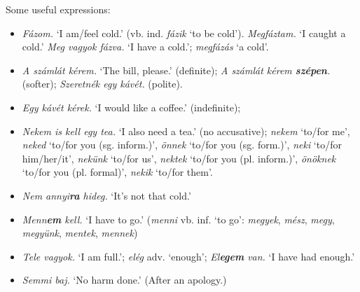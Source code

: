 \documentclass[a4paper,11pt]{article}
\begin{document}
\noindent Some useful expressions:
\begin{itemize}

  \item \emph{Fázom.} `I am/feel cold.' (vb. ind. \emph{fázik} `to be
    cold'). \emph{Megfáztam.} `I caught a cold.' \emph{Meg vagyok
    fázva.} `I have a cold.'; \emph{megfázás} `a cold'.

  \item \emph{A számlát kérem.} `The bill, please.' (definite);
    \emph{A számlát kérem \textbf{szépen}.} (softer); \emph{Szeretnék
    egy kávét.} (polite).

  \item \emph{Egy kávét kérek.} `I would like a coffee.' (indefinite);

  \item \emph{Nekem is kell egy tea.} `I also need a tea.' (no
    accusative); \emph{nekem} `to/for me', \emph{neked} `to/for you
    (sg. inform.)', \emph{önnek} `to/for you (sg. form.)', \emph{neki}
    `to/for him/her/it', \emph{nekünk} `to/for us', \emph{nektek}
    `to/for you (pl. inform.)', \emph{önöknek} `to/for you
    (pl. formal)', \emph{nekik} `to/for them'.

  \item \emph{Nem annyi\textbf{ra} hideg.} `It's not that cold.'

  \item \emph{Menn\textbf{em} kell.} `I have to go.' (\emph{menni}
    vb. inf. `to go': \emph{megyek}, \emph{mész}, \emph{megy},
    \emph{megyünk}, \emph{mentek}, \emph{mennek})

  \item \emph{Tele vagyok.} `I am full.'; \emph{elég} adv. `enough';
    \emph{El\textbf{egem} van.} `I have had enough.'

  \item \emph{Semmi baj.} `No harm done.' (After an apology.)

\end{itemize}
\end{document}
